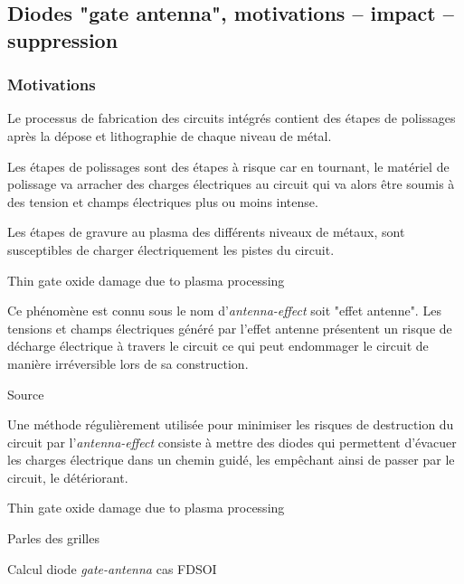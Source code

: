 
\subsection{Diodes "gate antenna", motivations – impact – suppression}
\subsubsection{Motivations}
Le processus de fabrication des circuits intégrés contient des étapes de polissages après la dépose et lithographie de chaque niveau de métal.

\begin{metsUneSource}
  Les étapes de polissages sont des étapes à risque car en tournant, le matériel de polissage va arracher des charges électriques au circuit qui va alors être soumis à des tension et champs électriques plus ou moins intense.
\end{metsUneSource}
Les étapes de gravure au plasma des différents niveaux de métaux, sont susceptibles de charger électriquement les pistes du circuit.

\begin{metsUneSource}
Thin gate oxide damage due to plasma processing
\end{metsUneSource}

Ce phénomène est connu sous le nom d'\textit{antenna-effect} soit "effet antenne". Les tensions et champs électriques généré par l'effet antenne présentent un risque de décharge électrique à travers le circuit ce qui peut endommager le circuit de manière irréversible lors de sa construction.

\begin{metsUneSource}
Source 
\end{metsUneSource}


Une méthode régulièrement utilisée pour minimiser les risques de destruction du circuit par l'\textit{antenna-effect} consiste à mettre des diodes qui permettent d’évacuer les charges électrique dans un chemin guidé, les empêchant ainsi de passer par le circuit, le détériorant.
\begin{metsUneSource}
  Thin gate oxide damage due to plasma processing
\end{metsUneSource}

\begin{metsUneSource}
Parles des grilles

Calcul diode \textit{gate-antenna} cas FDSOI
\end{metsUneSource}


